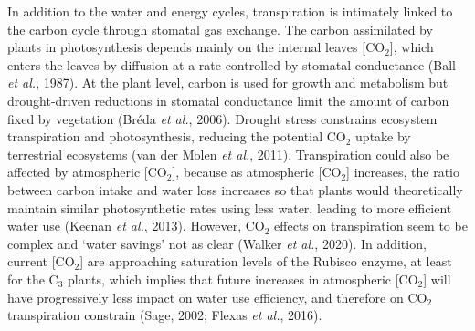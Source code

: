 \documentclass[11pt,twoside]{reedthesis}
\begin{document}
In addition to the water and energy cycles, transpiration is intimately
linked to the carbon cycle through stomatal gas exchange. The carbon
assimilated by plants in photosynthesis depends mainly on the internal
leaves {[}\(\text{CO}_2\){]}, which enters the leaves by diffusion at a
rate controlled by stomatal conductance (Ball \emph{et al.}, 1987). At
the plant level, carbon is used for growth and metabolism but
drought-driven reductions in stomatal conductance limit the amount of
carbon fixed by vegetation (Bréda \emph{et al.}, 2006). Drought stress
constrains ecosystem transpiration and photosynthesis, reducing the
potential \(\text{CO}_2\) uptake by terrestrial ecosystems (van der
Molen \emph{et al.}, 2011). Transpiration could also be affected by
atmospheric {[}\(\text{CO}_2\){]}, because as atmospheric
{[}\(\text{CO}_2\){]} increases, the ratio between carbon intake and
water loss increases so that plants would theoretically maintain similar
photosynthetic rates using less water, leading to more efficient water
use (Keenan \emph{et al.}, 2013). However, \(\text{CO}_2\) effects on
transpiration seem to be complex and `water savings' not as clear
(Walker \emph{et al.}, 2020). In addition, current {[}\(\text{CO}_2\){]}
are approaching saturation levels of the Rubisco enzyme, at least for
the \(\text{C}_3\) plants, which implies that future increases in
atmospheric {[}\(\text{CO}_2\){]} will have progressively less impact on
water use efficiency, and therefore on \(\text{CO}_2\) transpiration
constrain (Sage, 2002; Flexas \emph{et al.}, 2016).\par
\end{document}
